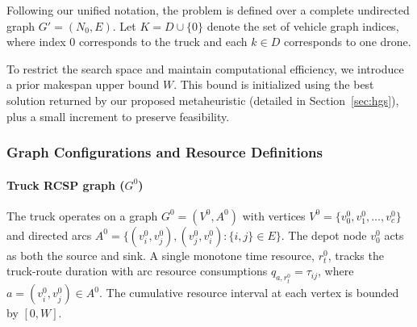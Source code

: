 \documentclass[3p, authoryear, 11pt]{elsarticle}
\begin{document}
Following our unified notation, the problem is defined over a complete undirected graph $G'=(N_0,E)$. Let $K=D\cup\{0\}$ denote the set of vehicle graph indices, where index $0$ corresponds to the truck and each $k\in D$ corresponds to one drone. 

To restrict the search space and maintain computational efficiency, we introduce a prior makespan upper bound $W$. This bound is initialized using the best solution returned by our proposed metaheuristic (detailed in Section~\ref{sec:hgs}), plus a small increment to preserve feasibility.


\subsubsection{Graph Configurations and Resource Definitions}

\paragraph{Truck RCSP graph ($G^0$)}
The truck operates on a graph $G^0=(V^0, A^0)$ with vertices $V^0 = \{v_0^0,v_1^0,\ldots,v_c^0\}$ and directed arcs $A^0 = \{(v_i^0,v_j^0),(v_j^0,v_i^0): \{i,j\}\in E\}$.
The depot node $v_0^0$ acts as both the source and sink. A single monotone time resource, $r_t^0$, tracks the truck-route duration with arc resource consumptions $q_{a,r_t^0}=\tau_{ij}$, where $a=(v_i^0,v_j^0)\in A^0$.
The cumulative resource interval at each vertex is bounded by $[0, W]$. 
\end{document}
